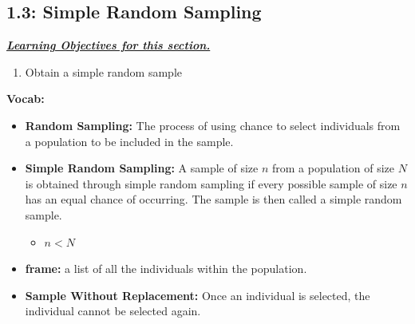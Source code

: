 \documentclass{report}
\begin{document}
        \pagebreak \bigbreak \noindent
        \subsection{1.3: Simple Random Sampling}
        \bigbreak \noindent 
        \textbf{\textit{\underline{Learning Objectives for this section.}}}
        \begin{enumerate}
            \item Obtain a simple random sample
        \end{enumerate}
        \bigbreak \noindent 
        \textbf{Vocab:}
        \begin{itemize}
            \item \textbf{Random Sampling:} The process of using chance to select individuals from a population to be included in the sample.
            \item \textbf{Simple Random Sampling:} A sample of size $n$  from a population of size $N $  is obtained through simple random sampling if every possible sample of size $n$  has an equal chance of occurring. The sample is then called a simple random sample.
                \begin{itemize}
                    \item $n < N $
                \end{itemize}
            \item \textbf{frame:} a list of all the individuals within the population.
            \item \textbf{Sample Without Replacement:} Once an individual is selected, the individual cannot be selected again.
        \end{itemize}

        \bigbreak \noindent 
\end{document}
